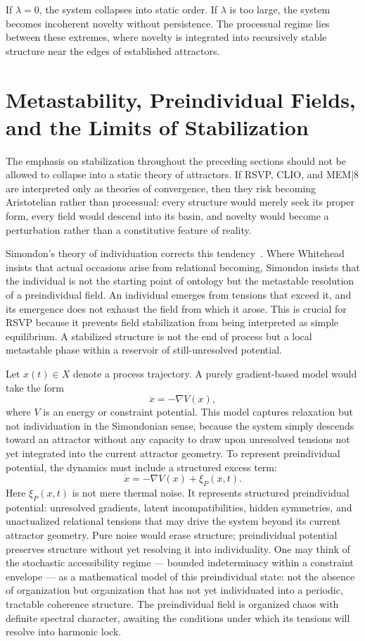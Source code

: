 \documentclass[12pt,a4paper]{article}
\begin{document}
If \(\lambda=0\), the system collapses into static order. If \(\lambda\) is too large, the system becomes incoherent novelty without persistence. The processual regime lies between these extremes, where novelty is integrated into recursively stable structure near the edges of established attractors.

\section{Metastability, Preindividual Fields, and the Limits of Stabilization}

The emphasis on stabilization throughout the preceding sections should not be allowed to collapse into a static theory of attractors. If RSVP, CLIO, and MEM|8 are interpreted only as theories of convergence, then they risk becoming Aristotelian rather than processual: every structure would merely seek its proper form, every field would descend into its basin, and novelty would become a perturbation rather than a constitutive feature of reality.

Simondon's theory of individuation corrects this tendency~\cite{simondon1989}. Where Whitehead insists that actual occasions arise from relational becoming, Simondon insists that the individual is not the starting point of ontology but the metastable resolution of a preindividual field. An individual emerges from tensions that exceed it, and its emergence does not exhaust the field from which it arose. This is crucial for RSVP because it prevents field stabilization from being interpreted as simple equilibrium. A stabilized structure is not the end of process but a local metastable phase within a reservoir of still-unresolved potential.

Let \(x(t)\in X\) denote a process trajectory. A purely gradient-based model would take the form
\[
\dot{x}=-\nabla V(x),
\]
where \(V\) is an energy or constraint potential. This model captures relaxation but not individuation in the Simondonian sense, because the system simply descends toward an attractor without any capacity to draw upon unresolved tensions not yet integrated into the current attractor geometry. To represent preindividual potential, the dynamics must include a structured excess term:
\[
\dot{x}
=
-\nabla V(x)
+
\xi_P(x,t).
\]
Here \(\xi_P(x,t)\) is not mere thermal noise. It represents structured preindividual potential: unresolved gradients, latent incompatibilities, hidden symmetries, and unactualized relational tensions that may drive the system beyond its current attractor geometry. Pure noise would erase structure; preindividual potential preserves structure without yet resolving it into individuality. One may think of the stochastic accessibility regime — bounded indeterminacy within a constraint envelope — as a mathematical model of this preindividual state: not the absence of organization but organization that has not yet individuated into a periodic, tractable coherence structure. The preindividual field is organized chaos with definite spectral character, awaiting the conditions under which its tensions will resolve into harmonic lock.
\end{document}
